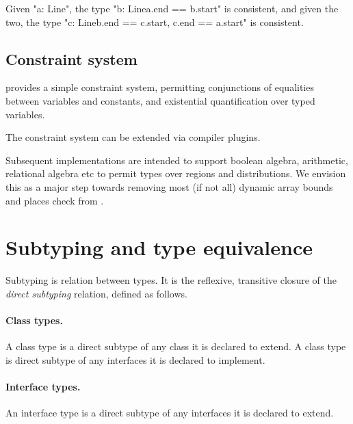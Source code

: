 Given \xcd"a: Line", the type \xcd"b: Line{a.end == b.start}" is consistent,
and
given the two, the type \xcd"c: Line{b.end == c.start, c.end == a.start}"
is consistent.


\subsection{Constraint system}

\Xten{} provides a simple constraint system,  
permitting conjunctions of equalities between variables and
constants, and existential quantification over typed variables.

The constraint system can be extended via compiler plugins.

Subsequent implementations are intended to support boolean algebra,
arithmetic, relational algebra etc to permit types over regions and
distributions. We envision this as a major step towards removing most
(if not all) dynamic array bounds and places check from \Xten{}.

\section{Subtyping and type equivalence}\label{DepType:Equivalence}

Subtyping is relation between types.  It is the
reflexive, transitive 
closure of the {\em direct subtyping} relation, defined as
follows.

\paragraph{Class types.}  A class type is a direct subtype of
any
class it is declared to extend.  A class type is direct subtype
of any interfaces it is declared to implement.

\paragraph{Interface types.}  An interface type is a direct
subtype of any interfaces it is declared to extend.

